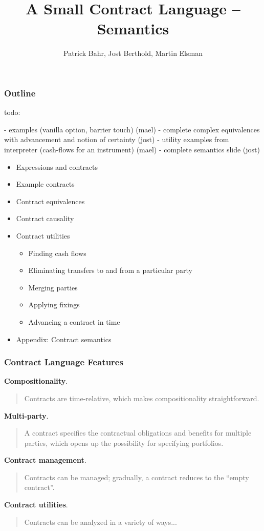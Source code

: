 \documentclass[xcolor=dvipsnames,11pt]{beamer}
\title{A Small Contract Language -- Semantics}
\author[Bahr,Berthold,Elsman]{Patrick Bahr, Jost Berthold, Martin Elsman}
\begin{document}
\frame[plain]{\titlepage}

\begin{frame}[fragile,t]
    \frametitle{Outline}

todo:

 - examples (vanilla option, barrier touch)                                     (mael)
 - complete complex equivalences with advancement and notion of certainty       (jost)
 - utility examples from interpreter (cash-flows for an instrument)             (mael)
 - complete semantics slide                                                     (jost)

\begin{itemize}
\item Expressions and contracts
\item Example contracts
\item Contract equivalences
\item Contract causality
\item Contract utilities
 \begin{itemize}
  \item Finding cash flows
  \item Eliminating transfers to and from a particular party
  \item Merging parties
  \item Applying fixings
  \item Advancing a contract in time
  \end{itemize}
\item Appendix: Contract semantics
\end{itemize}
\end{frame}

\begin{frame}[fragile,t]
    \frametitle{Contract Language Features}

\textbf{Compositionality}. 
\begin{quote}
Contracts are time-relative, which makes compositionality
straightforward.
\end{quote}

\textbf{Multi-party}.
\begin{quote}
A contract specifies the contractual obligations and benefits for
multiple parties, which opens up the possibility for specifying
portfolios.
\end{quote}

\textbf{Contract management}.
\begin{quote}
Contracts can be managed; gradually, a contract reduces to the ``empty
contract''.
\end{quote}

\textbf{Contract utilities}.
\begin{quote}
Contracts can be analyzed in a variety of ways...
\end{quote}

\end{frame} 
\end{document}
